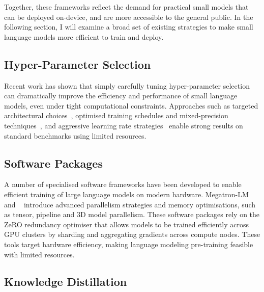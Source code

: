 Together, these frameworks reflect the demand for practical small models that can be deployed on-device, and are more accessible to the general public. In the following section, I will examine a broad set of existing strategies to make small language models more efficient to train and deploy.

\subsection{Hyper-Parameter Selection}

Recent work has shown that simply carefully tuning hyper-parameter selection can dramatically improve the efficiency and performance of small language models, even under tight computational constraints. Approaches such as targeted architectural choices~\citep{hillier2024super}, optimised training schedules and mixed-precision techniques~\citep{izsak2021train}, and aggressive learning rate strategies~\citep{geiping2023cramming} enable strong results on standard benchmarks using limited resources.

\subsection{Software Packages}

A number of specialised software frameworks have been developed to enable efficient training of large language models on modern hardware. Megatron-LM~\citep{narayanan2021megatron} and ~\citep{rasley2020deepspeed} introduce advanced parallelism strategies and memory optimisations, such as tensor, pipeline and 3D model parallelism. These software packages rely on the ZeRO redundancy optimiser \citep{rajbhandari2020zero} that allows models to be trained efficiently across GPU clusters by sharding and aggregating gradients across compute nodes. These tools target hardware efficiency, making language modeling pre-training feasible with limited resources.

\subsection{Knowledge Distillation}

